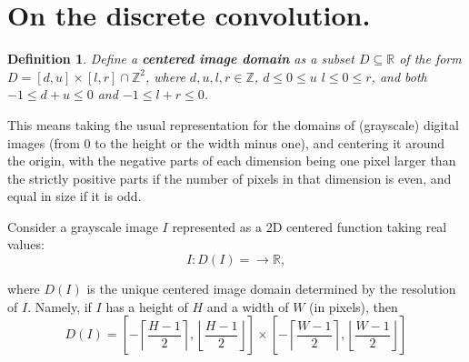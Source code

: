 \documentclass{article}
\newtheorem{definition}{Definition}
\begin{document}
%
%
%
%
%

\section{On the discrete convolution.}
\begin{definition}
  Define a \textbf{centered image domain} as a subset \(D\subseteq \mathbb{R}\) of the form \(D=[d, u]\times[l, r]\cap\mathbb{Z}^2\), where \(d, u, l, r\in \mathbb{Z}\), \(d\leq 0\leq u\) \(l \leq 0 \leq r\), and both \(-1\leq d + u\leq 0\) and \(-1\leq l+r\leq 0\).
\end{definition}

This means taking the usual representation for the domains of (grayscale) digital images (from \(0\) to the height or the width minus one), and centering it around the origin, with the negative parts of each dimension being one pixel larger than the strictly positive parts if the number of pixels in that dimension is even, and equal in size if it is odd.

Consider a grayscale image \(I\) represented as a 2D centered function taking real values:
\[
  I\colon D(I)=\to \mathbb{R}
,\]

where \(D(I)\) is the unique centered image domain determined by the resolution of \(I\). Namely, if \(I\) has a height of \(H\) and a width of \(W\) (in pixels), then
\begin{equation}\label{eq:domain-of-image}
  D(I) = \left[-\left\lceil\frac{H-1}{2}\right\rceil, \left\lfloor\frac{H-1}{2}\right\rfloor\right]\times\left[-\left\lceil\frac{W-1}{2}\right\rceil, \left\lfloor\frac{W-1}{2}\right\rfloor\right]
\end{equation}
\end{document}
